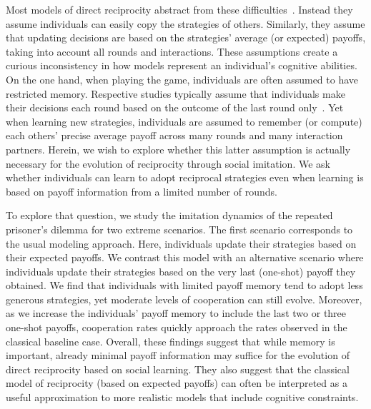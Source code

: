 \documentclass[11pt]{article}
\theoremstyle{plainCl1}
\theoremstyle{plainCl2}
\begin{document}
Most models of direct reciprocity abstract from these difficulties~\citep{brauchli:JTB:1999,brandt:JTB:2006,ohtsuki:JTB:2007b,szolnoki:pre:2009b,imhof2010stochastic,van-segbroeck:prl:2012,grujic:jtb:2012,Martinez2012,stewart:pnas:2013,pinheiro:PLoSCB:2014,stewart:games:2015,Baek2016,McAvoy:ProcA:2019,glynatsi:SCR:2020,Schmid:PlosCB:2022,Murase:SciRep:2022}. 
Instead they assume individuals can easily copy the strategies of others. 
Similarly, they assume that updating decisions are based on the strategies' average (or expected) payoffs, taking into account all rounds and interactions. 
These assumptions create a curious inconsistency in how models represent an individual's cognitive abilities. 
On the one hand, when playing the game, individuals are often assumed to have restricted memory. 
Respective studies typically assume that individuals make their decisions each round based on the outcome of the last round only~\citep[with only a few exceptions, see Refs.][]{Hauert1997,van-veelen:PNAS:2012,Stewart2016,Li:NatCS:2022,Murase:PLoSCompBio:2023a}. 
Yet when learning new strategies, individuals are assumed to remember (or compute) each others' precise average payoff across many rounds and many interaction partners. 
Herein, we wish to explore whether this latter assumption is actually necessary for the evolution of reciprocity through social imitation. 
We ask whether individuals can learn to adopt reciprocal strategies even when learning is based on payoff information from a limited number of rounds. 



To explore that question, we study the imitation dynamics of the repeated prisoner's dilemma for two extreme scenarios. 
The first scenario corresponds to the usual modeling approach. 
Here, individuals update their strategies based on their expected payoffs. 
We contrast this model with an alternative scenario where individuals update their strategies based on the very
last (one-shot) payoff they obtained. 
We find that individuals with limited payoff memory tend to adopt less generous strategies, yet moderate levels of cooperation can still evolve. 
Moreover, as we increase the individuals' payoff memory to include the last two or three one-shot payoffs, cooperation rates quickly approach the rates observed in the classical baseline case. 
Overall, these findings suggest that while memory is important, already minimal payoff information may suffice for the evolution of direct reciprocity based on social learning. 
They also suggest that the classical model of reciprocity (based on expected payoffs) can often be interpreted as a useful approximation to more realistic models that include cognitive constraints. 
\end{document}
